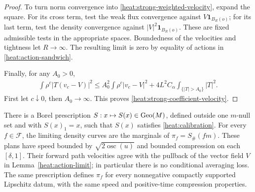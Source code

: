 \begin{proof}
To turn norm convergence into
\eqref{heat:strong-weighted-velocity}, expand the square.
For its cross term, test the weak flux convergence against
\(V\mathbf1_{B_R(o)}\); for its last term, test the density
convergence against \(|V|^2\mathbf1_{B_R(o)}\).
These are fixed admissible tests in the appropriate spaces.
Boundedness of the velocities and tightness let
\(R\to\infty\). The resulting limit is zero by equality
of actions in \eqref{heat:action-sandwich}.

Finally, for any \(A_0>0\),
\begin{align*}
\int\rho^c|T(v_c-V)|^2
\le A_0^2\int\rho^c|v_c-V|^2
+4L^2C_\alpha\int_{\{|T|>A_0\}}|T|^2.
\end{align*}
First let \(c\downarrow0\), then \(A_0\to\infty\).
This proves \eqref{heat:strong-coefficient-velocity}.
\end{proof}

\begin{lemma}
\label{heat:common-paths}
There is a Borel prescription \(S:x\mapsto S(x)\in\operatorname{Geo}(M)\),
defined outside one \(m\)-null set and with \(S(x)_1=x\),
such that \(S(x)\) satisfies \eqref{heat:calibration}.
For every \(f\in\mathcal F\), the limiting density curves
are the marginals of
\(\pi_f=S_\#(fm)\). These plans have speed bounded by
\(\sqrt{2\operatorname{osc}(u)}\) and bounded compression
on each \([\delta,1]\). Their forward path velocities agree
with the pullback of the vector field \(V\) in
Lemma~\ref{heat:action-limit}; in particular there is no
conditional averaging loss. The same prescription defines
\(\pi_f\) for every nonnegative compactly supported
Lipschitz datum, with the same speed and positive-time
compression properties.
\end{lemma}

